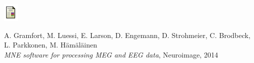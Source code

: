 \documentclass[t,11pt,compress]{beamer} %
\begin{document}
\begin{frame}[plain,t,c]
\begin{minipage}{\linewidth}
\smallskip
\centering
\begin{minipage}{0.05\linewidth}
    \includegraphics[width=0.9\linewidth]{paper_logo.pdf}%
\end{minipage}
\begin{minipage}{0.93\linewidth}
    A. Gramfort, M. Luessi, E. Larson, D. Engemann, D. Strohmeier, C. Brodbeck, L. Parkkonen, M. H\"am\"al\"ainen\hfill\\
    \emph{MNE software for processing MEG and EEG data}, Neuroimage, 2014
\end{minipage}\\
\begin{minipage}{0.05\linewidth}

\end{minipage}
\end{minipage}
\end{frame}
\end{document}
